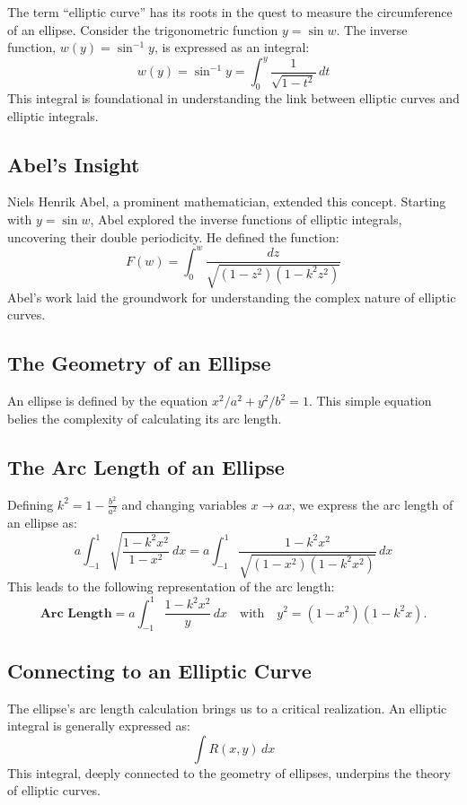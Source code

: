 The term ``elliptic curve'' has its roots in the quest to measure the circumference of an ellipse. Consider the trigonometric function \( y = \sin w \). The inverse function, \( w(y) = \sin^{-1} y \), is expressed as an integral:
\[
w(y) = \sin^{-1} y = \int_{0}^{y} \frac{1}{\sqrt{1 - t^2}} \, dt
\]
This integral is foundational in understanding the link between elliptic curves and elliptic integrals.

\subsection{Abel's Insight}
Niels Henrik Abel, a prominent mathematician, extended this concept. Starting with \( y = \sin w \), Abel explored the inverse functions of elliptic integrals, uncovering their double periodicity. He defined the function:
\[
F(w) = \int_{0}^{w} \frac{dz}{\sqrt{(1 - z^2)(1 - k^2 z^2)}}
\]
Abel's work laid the groundwork for understanding the complex nature of elliptic curves.

\subsection{The Geometry of an Ellipse}

An ellipse is defined by the equation \( x^2/a^2 + y^2/b^2 = 1 \). This simple equation belies the complexity of calculating its arc length.

\subsection{The Arc Length of an Ellipse}

Defining \( k^2 = 1 - \frac{b^2}{a^2} \) and changing variables \( x \rightarrow ax \), we express the arc length of an ellipse as:
\[
a \int_{-1}^{1} \sqrt{\frac{1 - k^2 x^2}{1 - x^2}} \, dx = a \int_{-1}^{1} \frac{1 - k^2 x^2}{\sqrt{(1 - x^2)(1 - k^2 x^2)}} \, dx
\]
This leads to the following representation of the arc length:
\[
\textbf{Arc Length} = a \int_{-1}^{1} \frac{1 - k^2 x^2}{y} \, dx\quad\text{with}\quad y^2=(1-x^2)(1-k^2x).
\]

\subsection{Connecting to an Elliptic Curve}

The ellipse's arc length calculation brings us to a critical realization. An elliptic integral is generally expressed as:
\[
\int R(x,y) \, dx
\]
This integral, deeply connected to the geometry of ellipses, underpins the theory of elliptic curves.

